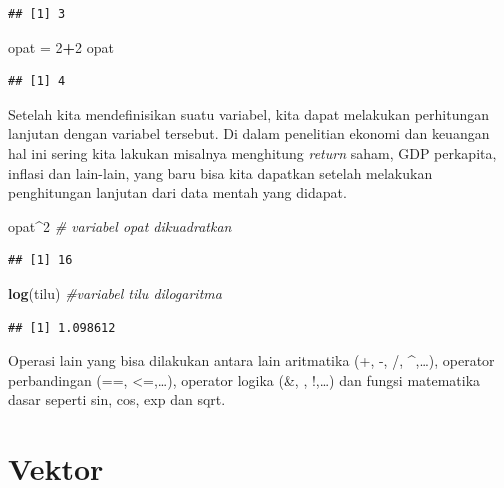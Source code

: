 \documentclass[a4paper, nobind]{templates/ociamthesis}
\newenvironment{Shaded}{\begin{snugshade}}{\end{snugshade}}
\newcommand{\CommentTok}[1]{\textcolor[rgb]{0.56,0.35,0.01}{\textit{#1}}}
\newcommand{\DecValTok}[1]{\textcolor[rgb]{0.00,0.00,0.81}{#1}}
\newcommand{\FunctionTok}[1]{\textcolor[rgb]{0.13,0.29,0.53}{\textbf{#1}}}
\newcommand{\NormalTok}[1]{#1}
\newcommand{\OtherTok}[1]{\textcolor[rgb]{0.56,0.35,0.01}{#1}}
\newcommand{\SpecialCharTok}[1]{\textcolor[rgb]{0.81,0.36,0.00}{\textbf{#1}}}
\renewenvironment{Shaded}
{
  \vspace{10pt}%
  \begin{snugshade}%
}{%
  \end{snugshade}%
  \vspace{8pt}%
}
\begin{document}
\begin{verbatim}
## [1] 3
\end{verbatim}

\begin{Shaded}
\begin{Highlighting}[]
\NormalTok{opat }\OtherTok{=} \DecValTok{2}\SpecialCharTok{+}\DecValTok{2}
\NormalTok{opat}
\end{Highlighting}
\end{Shaded}

\begin{verbatim}
## [1] 4
\end{verbatim}

Setelah kita mendefinisikan suatu variabel, kita dapat melakukan perhitungan lanjutan dengan variabel tersebut. Di dalam penelitian ekonomi dan keuangan hal ini sering kita lakukan misalnya menghitung \emph{return} saham, GDP perkapita, inflasi dan lain-lain, yang baru bisa kita dapatkan setelah melakukan penghitungan lanjutan dari data mentah yang didapat.

\begin{Shaded}
\begin{Highlighting}[]
\NormalTok{opat}\SpecialCharTok{\^{}}\DecValTok{2} \CommentTok{\# variabel opat dikuadratkan}
\end{Highlighting}
\end{Shaded}

\begin{verbatim}
## [1] 16
\end{verbatim}

\begin{Shaded}
\begin{Highlighting}[]
\FunctionTok{log}\NormalTok{(tilu) }\CommentTok{\#variabel tilu dilogaritma}
\end{Highlighting}
\end{Shaded}

\begin{verbatim}
## [1] 1.098612
\end{verbatim}

Operasi lain yang bisa dilakukan antara lain aritmatika (+, -, /, \^{},\ldots), operator perbandingan (==, \textless=,\ldots), operator logika (\&, \textbar, !,\ldots) dan fungsi matematika dasar seperti sin, cos, exp dan sqrt.

\hypertarget{vektor}{%
\section{Vektor}\label{vektor}}
\end{document}
